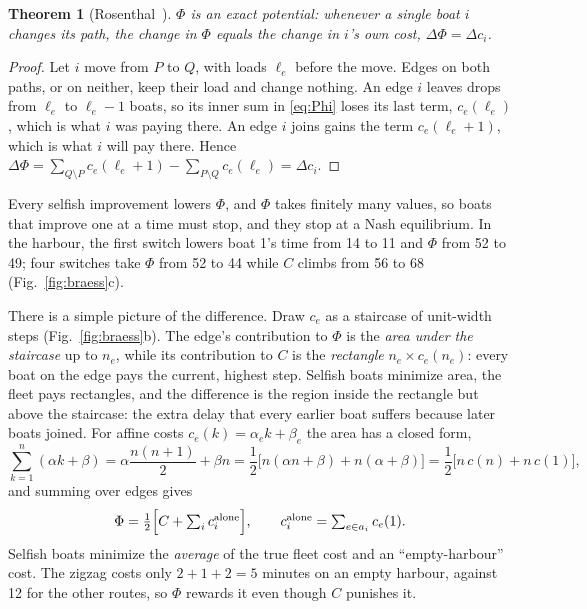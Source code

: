 \documentclass[11pt]{article}
\newtheorem{theorem}{Theorem}
\theoremstyle{definition}
\begin{document}
\begin{theorem}[Rosenthal~\cite{rosenthal1973}]\label{thm:rosenthal}
$\Phi$ is an exact potential: whenever a single boat $i$ changes its path, the change in $\Phi$ equals the change in $i$'s own cost, $\Delta\Phi=\Delta c_i$.
\end{theorem}
\begin{proof}
Let $i$ move from $P$ to $Q$, with loads $\ell_e$ before the move. Edges on both paths, or on neither, keep their load and change nothing. An edge $i$ leaves drops from $\ell_e$ to $\ell_e-1$ boats, so its inner sum in \eqref{eq:Phi} loses its last term, $c_e(\ell_e)$, which is what $i$ was paying there. An edge $i$ joins gains the term $c_e(\ell_e+1)$, which is what $i$ will pay there. Hence $\Delta\Phi=\sum_{Q\setminus P}c_e(\ell_e+1)-\sum_{P\setminus Q}c_e(\ell_e)=\Delta c_i$.
\end{proof}
Every selfish improvement lowers $\Phi$, and $\Phi$ takes finitely many values, so boats that improve one at a time must stop, and they stop at a Nash equilibrium. In the harbour, the first switch lowers boat 1's time from 14 to 11 and $\Phi$ from 52 to 49; four switches take $\Phi$ from 52 to 44 while $C$ climbs from 56 to 68 (Fig.~\ref{fig:braess}c).

There is a simple picture of the difference. Draw $c_e$ as a staircase of unit-width steps (Fig.~\ref{fig:braess}b). The edge's contribution to $\Phi$ is the \emph{area under the staircase} up to $n_e$, while its contribution to $C$ is the \emph{rectangle} $n_e\times c_e(n_e)$: every boat on the edge pays the current, highest step. Selfish boats minimize area, the fleet pays rectangles, and the difference is the region inside the rectangle but above the staircase: the extra delay that every earlier boat suffers because later boats joined. For affine costs $c_e(k)=\alpha_e k+\beta_e$ the area has a closed form,
\[
\sum_{k=1}^{n}(\alpha k+\beta)=\alpha\frac{n(n+1)}{2}+\beta n=\frac12\Big[n(\alpha n+\beta)+n(\alpha+\beta)\Big]=\frac12\Big[n\,c(n)+n\,c(1)\Big],
\]
and summing over edges gives
\begin{equation}
\Phi=\tfrac12\Big[C+\textstyle\sum_i c_i^{\rm alone}\Big],\qquad c_i^{\rm alone}=\sum_{e\in a_i}c_e(1). \label{eq:half}
\end{equation}
Selfish boats minimize the \emph{average} of the true fleet cost and an ``empty-harbour'' cost. The zigzag costs only $2+1+2=5$ minutes on an empty harbour, against 12 for the other routes, so $\Phi$ rewards it even though $C$ punishes it.
\end{document}
